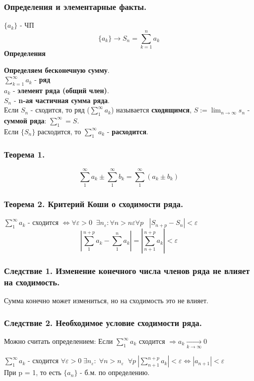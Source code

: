 \documentclass[12pt, a4paper]{article}
\newcommand{\eps}{\varepsilon}
\begin{document}
\begin{centering}
\subsubsection{Определения и элементарные факты.}
$ \{a_k\} $ - ЧП
\[ \{a_k\} \to S_n = \sum^n_{k=1}a_k \]
\textbf{Определения}
\begin{tcolorbox}
    \textbf{Определяем бесконечную сумму}.\\
    $\sum^\infty_{k=1} a_k$ - \textbf{ряд}\\
    $a_k$ - \textbf{элемент ряда (общий член)}.\\
    $S_n$ - \textbf{n-ая частичная сумма ряда}.\\
    Если $S_n$ - сходится, то ряд ($\sum^\infty_{1} a_k$) называется \textbf{сходящимся}, $S:=\lim_{n\to\infty} s_n$ - \textbf{суммой ряда}: $\sum_1^\infty = S$.\\
    Если $\{S_n\}$ расходится, то $\sum^\infty_{1} a_k$ - \textbf{расходится}.
\end{tcolorbox}
\subsubsection{\textbf{Теорема 1.}}
\[ \sum_1^\infty a_k \pm \sum_1^\infty b_k = \sum_1^\infty (a_k \pm b_k) \]
\subsubsection{\textbf{Теорема 2. Критерий Коши о сходимости ряда.}}
$ \sum_1^\infty a_k$ - сходится $\Leftrightarrow \forall \eps > 0\;\; \exists n_\eps : \forall n > n\eps \forall p \;\;\; |S_{n+p} - S_n| < \eps $
\[ |\sum_1^{n+p} a_k - \sum_1^n a_k| = |\sum_{n+1}^{n+p} a_k| < \eps \]
\subsubsection{\textbf{Следствие 1. Изменение конечного числа членов ряда не влияет на сходимость.}}
Сумма конечно может измениться, но на сходимость это не влияет.
\subsubsection{\textbf{Следствие 2. Необходимое условие сходимости ряда.}}
Можно считать определением: Если $\sum_1^\infty a_k$ сходится $\Rightarrow a_k \xrightarrow[k\to\infty]{} 0$\\
\begin{tcolorbox}[title=Доказательство]
    $\sum_1^\infty a_k$ - сходится $\forall \eps > 0\; \exists n_\eps:\; \forall n > n_\eps\;\; \forall p \ |\sum_{n+1}^{n+p} a_k| < \eps \Leftrightarrow |a_{n+1}| < \eps$\\
    При p = 1, то есть $\{a_n\}$ - б.м. по определению.
\end{tcolorbox}

\end{centering}
\end{document}
